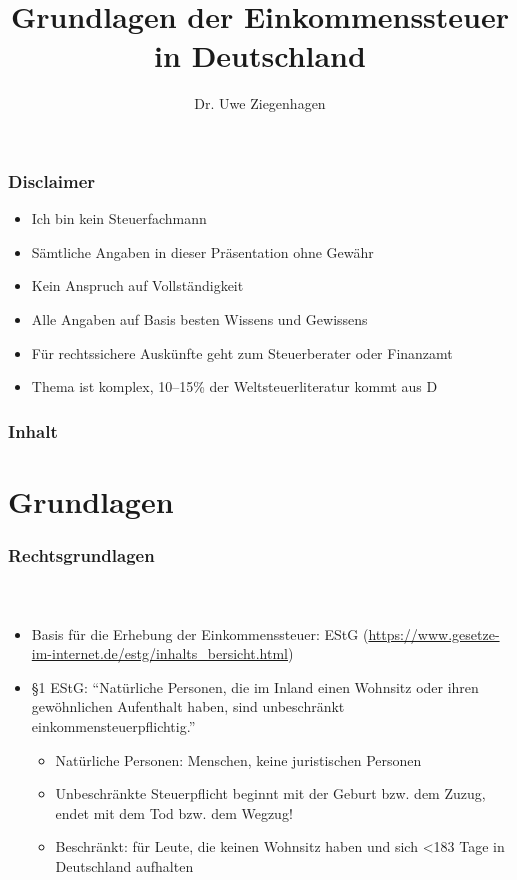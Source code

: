 \documentclass[ngerman]{beamer}
\author{Dr. Uwe Ziegenhagen}
\title{Grundlagen der Einkommenssteuer in Deutschland}
\begin{document}
\begin{frame}

\maketitle

\end{frame}

\begin{frame}
\frametitle{Disclaimer}

\begin{itemize}
\item Ich bin kein Steuerfachmann
\item Sämtliche Angaben in dieser Präsentation ohne Gewähr
\item Kein Anspruch auf Vollständigkeit
\item Alle Angaben auf Basis besten Wissens und Gewissens
\item Für rechtssichere Auskünfte geht zum Steuerberater oder Finanzamt
\item Thema ist komplex, 10--15\% der Weltsteuerliteratur kommt aus D
\end{itemize}
\end{frame}


\begin{frame}
\frametitle{Inhalt}

\tableofcontents

\end{frame}

\section{Grundlagen}

\begin{frame}
\frametitle{Rechtsgrundlagen}
\framesubtitle{~}

\begin{itemize}
\item Basis für die Erhebung der Einkommenssteuer: EStG (\url{https://www.gesetze-im-internet.de/estg/inhalts_bersicht.html})
\item §1 EStG: \enquote{Natürliche Personen, die im Inland einen Wohnsitz oder ihren gewöhnlichen Aufenthalt haben, sind unbeschränkt einkommensteuerpflichtig.}

\begin{itemize}
	\item Natürliche Personen: Menschen, keine juristischen Personen
	\item Unbeschränkte Steuerpflicht beginnt mit der Geburt bzw. dem Zuzug, endet mit dem Tod bzw. dem Wegzug!
	\item Beschränkt: für Leute, die keinen Wohnsitz haben und sich <183 Tage in Deutschland aufhalten
\end{itemize}
\end{itemize}
\end{frame}
\end{document}
